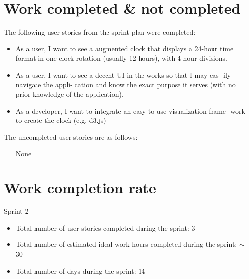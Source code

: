 \documentclass[11pt]{article}
\begin{document}
	\section{Work completed \& not completed}
		\vspace{-3mm}
		\normalsize{The following user stories from the sprint plan were completed:}\\
		\vspace{-3mm}
		\begin{itemize}
			\item As a user, I want to see a augmented clock that displays a 24-hour time format in one clock rotation (usually 12 hours), with 4 hour divisions.
			\item As a user, I want to see a decent UI in the works so that I may eas- ily navigate the appli- cation and know the exact purpose it serves (with no prior knowledge of the application).
			\item As a developer, I want to integrate an easy-to-use visualization frame- work to create the clock (e.g. d3.js).
		\end{itemize}
		\vspace{-3mm}
		\normalsize{The uncompleted user stories are as follows:}\\
		\vspace{-3mm}
		\begin{itemize}		
			\item [None]
		\end{itemize}
		\vspace{-3mm}
		
	\section{Work completion rate}
		\vspace{-3mm}
		\normalsize{Sprint 2}\\
		\vspace{-3mm}
		\begin{itemize}
			\item Total number of user stories completed during the sprint: 3
			\vspace{-3mm}
			\item Total number of estimated ideal work hours completed during the sprint: $\sim$ 30
			\vspace{-3mm}
			\item Total number of days during the sprint: 14
		\end{itemize}
	
\end{document}
